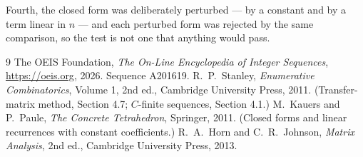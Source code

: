 \documentclass[11pt,a4paper]{article}
\theoremstyle{plain}
\theoremstyle{definition}
\begin{document}
Fourth, the closed form was deliberately perturbed --- by a constant and by a term linear in
$n$ --- and each perturbed form was rejected by the same comparison, so the test is not one
that anything would pass.

\begin{thebibliography}{9}
 The OEIS Foundation, \emph{The On-Line Encyclopedia of Integer
Sequences}, \url{https://oeis.org}, 2026. Sequence A201619.
 R.~P.~Stanley, \emph{Enumerative Combinatorics}, Volume 1, 2nd ed.,
Cambridge University Press, 2011. (Transfer-matrix method, Section 4.7; $C$-finite sequences,
Section 4.1.)
 M.~Kauers and P.~Paule, \emph{The Concrete Tetrahedron}, Springer, 2011.
(Closed forms and linear recurrences with constant coefficients.)
 R.~A.~Horn and C.~R.~Johnson, \emph{Matrix Analysis}, 2nd ed., Cambridge
University Press, 2013.
\end{thebibliography}
\end{document}
